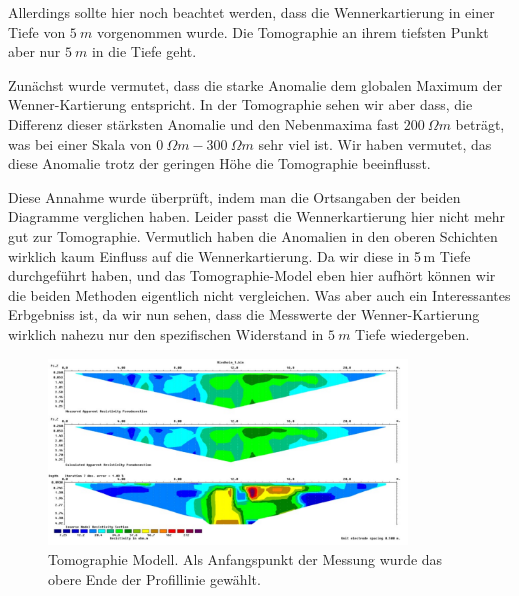 Allerdings sollte hier noch beachtet werden, dass die Wennerkartierung in einer Tiefe von $\SI{5}{m}$ vorgenommen wurde. Die Tomographie an ihrem tiefsten Punkt aber nur $\SI{5}{m}$ in die Tiefe geht. 

Zunächst wurde vermutet, dass die starke Anomalie dem globalen Maximum der Wenner-Kartierung entspricht. In der Tomographie sehen wir aber dass, die Differenz dieser stärksten Anomalie und den Nebenmaxima fast $\SI{200}{\Omega m}$ beträgt, was bei einer Skala von $\SI{0}{\Omega m}- \SI{300}{\Omega m}$ sehr viel ist. Wir haben vermutet, das diese Anomalie trotz der geringen Höhe die Tomographie beeinflusst.


Diese Annahme wurde überprüft, indem man die Ortsangaben der beiden Diagramme verglichen haben. Leider passt die Wennerkartierung hier nicht mehr gut zur Tomographie. Vermutlich haben die Anomalien in den oberen Schichten wirklich kaum Einfluss auf die Wennerkartierung. Da wir diese in 5\,m Tiefe durchgeführt haben, und das Tomographie-Model eben hier aufhört können wir die beiden Methoden eigentlich nicht vergleichen. Was aber auch ein Interessantes Erbgebniss ist, da wir nun sehen, dass die Messwerte der Wenner-Kartierung wirklich nahezu nur den spezifischen Widerstand in $\SI{5}{m}$ Tiefe wiedergeben.





\begin{figure}[h]
\centering
\includegraphics[width=0.85\textwidth]{fig/Tomographie.pdf}
\caption{Tomographie Modell. Als Anfangspunkt der Messung wurde das obere Ende der Profillinie gewählt.}
\label{abb:Tomographie}
\end{figure}
  


